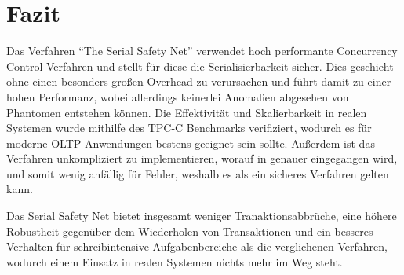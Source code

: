 \section{Fazit}
\label{sec:fazit}

Das Verfahren \enquote{The Serial Safety Net} verwendet hoch performante Concurrency Control Verfahren und stellt für diese die Serialisierbarkeit sicher.
Dies geschieht ohne einen besonders großen Overhead zu verursachen und führt damit zu einer hohen Performanz, wobei allerdings keinerlei Anomalien abgesehen von Phantomen entstehen können.
Die Effektivität und Skalierbarkeit in realen Systemen wurde mithilfe des TPC-C Benchmarks verifiziert, wodurch es für moderne OLTP-Anwendungen bestens geeignet sein sollte.
Außerdem ist das Verfahren unkompliziert zu implementieren, worauf in \cite{Wang:2015} genauer eingegangen wird, und somit wenig anfällig für Fehler, weshalb es als ein sicheres Verfahren gelten kann.

Das Serial Safety Net bietet insgesamt weniger Tranaktionsabbrüche, eine höhere Robustheit gegenüber dem Wiederholen von Transaktionen und ein besseres Verhalten für schreibintensive Aufgabenbereiche als die verglichenen Verfahren, wodurch einem Einsatz in realen Systemen nichts mehr im Weg steht.
